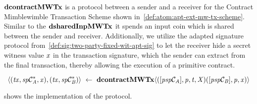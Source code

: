 $\mathbf{dcontractMWTx}$ is a protocol between a sender and a receiver for the Contract Mimblewimble Transaction Scheme shown in~\cref{def:atom:apt-ext-mw-tx-scheme}.
Similar to the $\mathbf{dsharedInpMWTx}$ it spends an input coin which is shared between the sender and receiver.
Additionally, we utilize the adapted signature protocol from~\cref{def:sig:two-party-fixed-wit-apt-sig} to let the receiver hide a secret witness value $\mathit{x}$ in the transaction signature, which the sender can extract from the final transaction, thereby allowing the execution of a primitive contract.

\[ \langle (\mathit{tx}, \mathit{sp}\mathcal{C}_{\mathit{A}}^*, \mathit{x}), (\mathit{tx}, \mathit{sp}\mathcal{C}_{\mathit{B}}^*) \rangle ~\leftarrow~ \mathbf{dcontractMWTx} \langle([\mathit{psp}\mathcal{C}_{\mathit{A}}],\mathit{p},\mathit{t},\mathit{X}) ([\mathit{psp}\mathcal{C}_{\mathit{B}}],\mathit{p},\mathit{x}) \rangle \]

 shows the implementation of the protocol.


